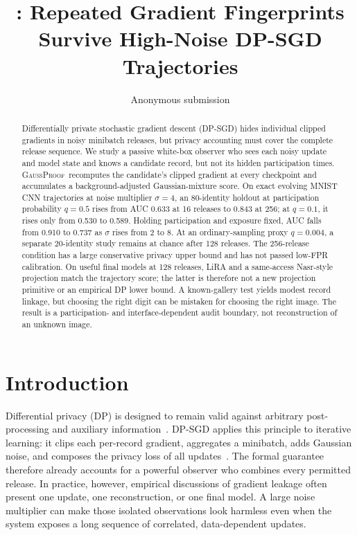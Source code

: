\documentclass[conference]{IEEEtran}
\title{\method: Repeated Gradient Fingerprints Survive High-Noise DP-SGD Trajectories}
\author{Anonymous submission}
\newcommand{\method}{\textsc{GaussProof}}
\begin{document}
\maketitle

\begin{abstract}
Differentially private stochastic gradient descent (DP-SGD) hides individual clipped gradients in noisy minibatch releases, but privacy accounting must cover the complete release sequence. We study a passive white-box observer who sees each noisy update and model state and knows a candidate record, but not its hidden participation times. \method\ recomputes the candidate's clipped gradient at every checkpoint and accumulates a background-adjusted Gaussian-mixture score. On exact evolving MNIST CNN trajectories at noise multiplier $\sigma=4$, an 80-identity holdout at participation probability $q=0.5$ rises from AUC 0.633 at 16 releases to 0.843 at 256; at $q=0.1$, it rises only from 0.530 to 0.589. Holding participation and exposure fixed, AUC falls from 0.910 to 0.737 as $\sigma$ rises from 2 to 8. At an ordinary-sampling proxy $q=0.004$, a separate 20-identity study remains at chance after 128 releases. The 256-release condition has a large conservative privacy upper bound and has not passed low-FPR calibration. On useful final models at 128 releases, LiRA and a same-access Nasr-style projection match the trajectory score; the latter is therefore not a new projection primitive or an empirical DP lower bound. A known-gallery test yields modest record linkage, but choosing the right digit can be mistaken for choosing the right image. The result is a participation- and interface-dependent audit boundary, not reconstruction of an unknown image.
\end{abstract}


\section{Introduction}

Differential privacy (DP) is designed to remain valid against arbitrary post-processing and auxiliary information~\cite{dwork2006calibrating,dwork2014algorithmic}. DP-SGD applies this principle to iterative learning: it clips each per-record gradient, aggregates a minibatch, adds Gaussian noise, and composes the privacy loss of all updates~\cite{abadi2016deep}. The formal guarantee therefore already accounts for a powerful observer who combines every permitted release. In practice, however, empirical discussions of gradient leakage often present one update, one reconstruction, or one final model. A large noise multiplier can make those isolated observations look harmless even when the system exposes a long sequence of correlated, data-dependent updates.
\end{document}
